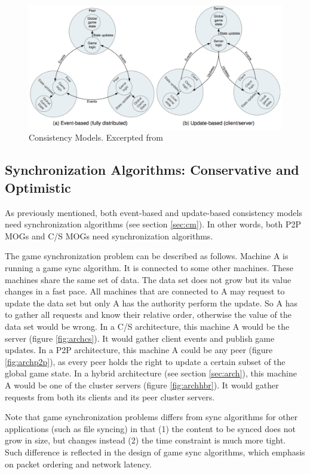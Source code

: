 \documentclass{article}
\begin{document}
\begin{figure}
\begin{center}
\includegraphics[scale=0.3]{images/sm.png}
\caption{Consistency Models. Excerpted from \cite{Gilmore12}}
\label{fig:cm}
\end{center}
\end{figure}

\subsection{Synchronization Algorithms: Conservative and Optimistic}
\label{sec:sa}
As previously mentioned, both event-based and update-based consistency models need synchronization algorithms (see section \ref{sec:cm}). In other words, both P2P MOGs and C/S MOGs need synchronization algorithms.

The game synchronization problem can be described as follows. Machine A is running a game sync algorithm. It is connected to some other machines. These machines share the same set of data. The data set does not grow but its value changes in a fast pace. All machines that are connected to A may request to update the data set but only A has the authority perform the update. So A has to gather all requests and know their relative order, otherwise the value of the data set would be wrong. In a C/S architecture, this machine A would be the server (figure \ref{fig:archcs}). It would gather client events and publish game updates. In a P2P architecture, this machine A could be any peer (figure \ref{fig:archp2p}), as every peer holds the right to update a certain subset of the global game state. In a hybrid architecture (see section \ref{sec:arch}), this machine A would be one of the cluster servers (figure \ref{fig:archhbr}). It would gather requests from both its clients and its peer cluster servers.

Note that game synchronization problems differs from sync algorithms for other applications (such as file syncing) in that (1) the content to be synced does not grow in size, but changes instead (2) the time constraint is much more tight. Such difference is reflected in the design of game sync algorithms, which emphasis on packet ordering and network latency.
\end{document}
